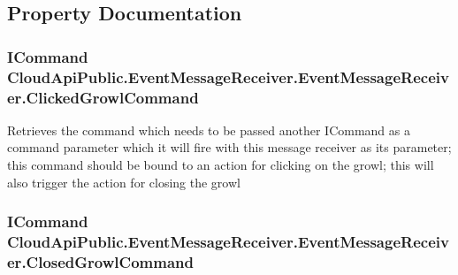 \subsection{Property Documentation}
\hypertarget{class_cloud_api_public_1_1_event_message_receiver_1_1_event_message_receiver_afce60beabd6d3468cefb6366df1b1a53}{
\subsubsection[{Clicked\-Growl\-Command}]{\setlength{\rightskip}{0pt plus 5cm}I\-Command Cloud\-Api\-Public.\-Event\-Message\-Receiver.\-Event\-Message\-Receiver.\-Clicked\-Growl\-Command\hspace{0.3cm}{\ttfamily [get]}}}\label{class_cloud_api_public_1_1_event_message_receiver_1_1_event_message_receiver_afce60beabd6d3468cefb6366df1b1a53}


Retrieves the command which needs to be passed another I\-Command as a command parameter which it will fire with this message receiver as its parameter; this command should be bound to an action for clicking on the growl; this will also trigger the action for closing the growl 

\hypertarget{class_cloud_api_public_1_1_event_message_receiver_1_1_event_message_receiver_abd28c2b693c427cd686a5b79e07f99de}{
\subsubsection[{Closed\-Growl\-Command}]{\setlength{\rightskip}{0pt plus 5cm}I\-Command Cloud\-Api\-Public.\-Event\-Message\-Receiver.\-Event\-Message\-Receiver.\-Closed\-Growl\-Command\hspace{0.3cm}{\ttfamily [get]}}}\label{class_cloud_api_public_1_1_event_message_receiver_1_1_event_message_receiver_abd28c2b693c427cd686a5b79e07f99de}


